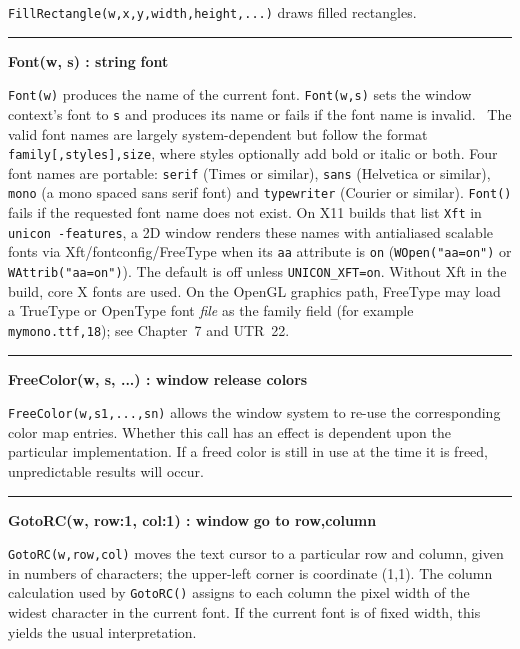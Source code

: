 \noindent
\texttt{FillRectangle(w,x,y,width,height,...)} draws filled rectangles.

\bigskip\hrule\vspace{0.1cm}
\noindent
{\bf Font(w, s) : string } \hfill {\bf font}

\noindent
\texttt{Font(w)} produces the name of the current font.
\texttt{Font(w,s)} sets the window context's font to
\texttt{s} and produces its name or fails if the font name is invalid.
\ The valid font names are largely system-dependent but follow the
format \texttt{family[,styles],size}, where styles optionally add bold
or italic or both. Four font names are portable: \texttt{serif} (Times
or similar), \texttt{sans} (Helvetica or similar), \texttt{mono} (a
mono spaced sans serif font) and \texttt{typewriter} (Courier or
similar). \texttt{Font()} fails if the requested font name does not
exist.
On X11 builds that list \texttt{Xft} in \texttt{unicon -features},
a 2D window renders these names with antialiased scalable fonts via
Xft/fontconfig/FreeType when its \texttt{aa} attribute is \texttt{on}
(\texttt{WOpen("aa=on")} or \texttt{WAttrib("aa=on")}). The default
is off unless \texttt{UNICON\_XFT=on}. Without Xft in the build, core
X fonts are used.
On the OpenGL graphics path, FreeType may load a TrueType or OpenType
font \emph{file} as the family field (for example
\texttt{mymono.ttf,18}); see Chapter~7 and UTR~22.

\bigskip\hrule\vspace{0.1cm}
\noindent
{\bf FreeColor(w, s, ...) : window } \hfill {\bf release colors}

\noindent
\texttt{FreeColor(w,s1,...,sn)} allows the window system to re-use the
corresponding color map entries. Whether this call has an effect is
dependent upon the particular implementation. If a freed color is
still in use at the time it is freed, unpredictable results will occur.

\bigskip\hrule\vspace{0.1cm}
\noindent
{\bf GotoRC(w, row:1, col:1) : window } \hfill {\bf go to row,column}

\noindent
\texttt{GotoRC(w,row,col)} moves the text cursor to a particular row and
column, given in numbers of characters; the upper-left corner is
coordinate (1,1). The column calculation used by \texttt{GotoRC()}
assigns to each column the pixel width of the widest character in the
current font. If the current font is of fixed width, this yields the
usual interpretation.


